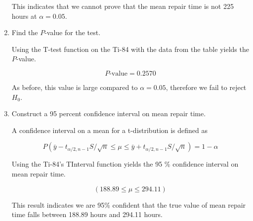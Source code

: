 \documentclass[../main.tex]{subfiles}
\begin{document}
\begin{enumerate}[label=(\alph*)]
    This indicates that we cannot prove that the mean repair time is not 225 hours at \(\alpha = 0.05\).

    \item
    Find the $P$-value for the test.

    \solution{}
    Using the T-test function on the Ti-84 with the data from the table yields the $P$-value.

    \[\boxed{P\textrm{-value} = 0.2570}\]
    
    As before, this value is large compared to \(\alpha = 0.05\), therefore we fail to reject \(H_0\). 

    \item
    Construct a 95 percent confidence interval on mean repair time.

    \solution{}

    A confidence interval on a mean for a t-distribution is defined as

    \[ 
        P
        \left({
            \bar{y} - t_{\alpha/2,n-1} S/\sqrt{n} \le \mu \le \bar{y} + t_{\alpha/2,n-1} S/\sqrt{n}
        }\right)  
        = 1 - \alpha 
    \]

    Using the Ti-84's TInterval function yields the 95 \% confidence interval on mean repair time.

    \[
        \boxed{\left(188.89 \le \mu \le 294.11\right)}
    \]

    This result indicates we are 95\% confident that the true value of mean repair time falls between 188.89 hours and 294.11 hours. 
    
\end{enumerate}
\end{document}

